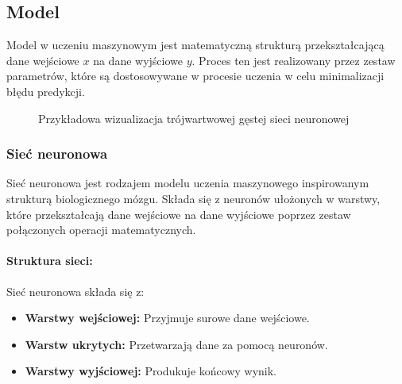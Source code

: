 \subsection{Model}

Model w uczeniu maszynowym jest matematyczną strukturą przekształcającą dane wejściowe \(x\) na dane wyjściowe \(y\). Proces ten jest realizowany przez zestaw parametrów, które są dostosowywane w procesie uczenia w celu minimalizacji błędu predykcji.

\begin{figure}
	\begin{center}
	\end{center}
	\caption{Przykładowa wizualizacja trójwartwowej gęstej sieci neuronowej}
	\label{fig:neuron_layers}
\end{figure}

\subsubsection{Sieć neuronowa}

Sieć neuronowa jest rodzajem modelu uczenia maszynowego inspirowanym strukturą biologicznego mózgu. Składa się z neuronów ułożonych w warstwy, które przekształcają dane wejściowe na dane wyjściowe poprzez zestaw połączonych operacji matematycznych.

\paragraph{Struktura sieci:}
Sieć neuronowa składa się z:
\begin{itemize}
	\item \textbf{Warstwy wejściowej:} Przyjmuje surowe dane wejściowe.
	\item \textbf{Warstw ukrytych:} Przetwarzają dane za pomocą neuronów.
	\item \textbf{Warstwy wyjściowej:} Produkuje końcowy wynik.
\end{itemize}

